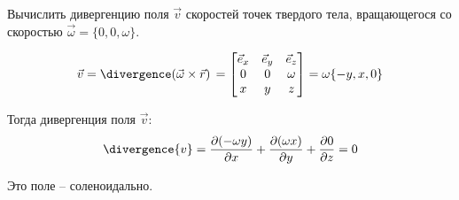 	\begin{example}
	Вычислить дивергенцию поля \( \vec{v} \) скоростей точек твердого тела, вращающегося со скоростью \( \vec{\omega} = \{ 0, 0, \omega \} \).
	\end{example}
	\begin{solution}
	\[ \vec{v} = \divergence(\vec{\omega}\times\vec{r})\, = \begin{bmatrix}
	\vec{e}_x & \vec{e}_y & \vec{e}_z \\
	0 & 0 & \omega \\
	x & y & z
	\end{bmatrix} = \omega\{ -y, x, 0 \} \]
	
	Тогда дивергенция поля \( \vec{v} \):
	\[ \divergence{v} = \frac{\partial (-\omega y)}{\partial x} + \frac{\partial (\omega x)}{\partial y} + \frac{\partial 0}{\partial z} = 0 \]
	
	Это поле -- соленоидально.
	\end{solution}
%	
%	
%	
	
